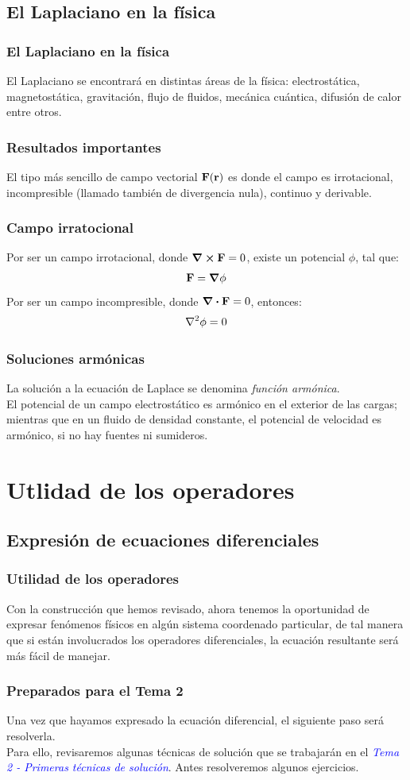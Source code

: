 \documentclass[12pt]{beamer}
\begin{document}
\subsection{El Laplaciano en la física}
\begin{frame}
\frametitle{El Laplaciano en la física}
El Laplaciano se encontrará en distintas áreas de la física: electrostática, magnetostática, gravitación, flujo de fluidos, mecánica cuántica, difusión de calor entre otros.
\end{frame}
\begin{frame}
\frametitle{Resultados importantes}
El tipo más sencillo de campo vectorial $\vb{F}(\vb{r})$ es donde el campo es irrotacional, incompresible (llamado también de divergencia nula), continuo y derivable.
\end{frame}
\begin{frame}
\frametitle{Campo irratocional}
Por ser un campo irrotacional, donde $\curl{\vb{F}} = 0$, existe un potencial $\phi$, tal que:
\begin{align*}
\vb{F} = \grad{\phi}
\end{align*}
\pause
Por ser un campo incompresible, donde $\div{\vb{F}} = 0$, entonces:
\begin{align*}
\laplacian{\phi} = 0
\end{align*}
\end{frame}
\begin{frame}
\frametitle{Soluciones armónicas}
La solución a la ecuación de Laplace se denomina \emph{función armónica}.
\\
\bigskip
\pause
El potencial de un campo electrostático es armónico en el exterior de las cargas; mientras que en un fluido de densidad constante, el potencial de velocidad es armónico, si no hay fuentes ni sumideros.
\end{frame}
\section{Utlidad de los operadores}
\subsection{Expresión de ecuaciones diferenciales}
\begin{frame}
\frametitle{Utilidad de los operadores}
Con la construcción que hemos revisado, ahora tenemos la oportunidad de expresar fenómenos físicos en algún sistema coordenado particular, de tal manera que si están involucrados los operadores diferenciales, la ecuación resultante será más fácil de manejar.
\end{frame}
\begin{frame}
\frametitle{Preparados para el Tema 2}
Una vez que hayamos expresado la ecuación diferencial, el siguiente paso será resolverla.
\\
\bigskip
\pause
Para ello, revisaremos algunas técnicas de solución que se trabajarán en el \emph{\textcolor{blue}{Tema 2 - Primeras técnicas de solución}}. Antes resolveremos algunos ejercicios.
\end{frame}
\end{document}
